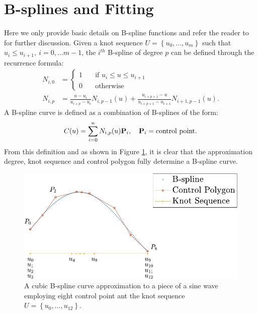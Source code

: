  \section{B-splines and Fitting}
 Here we only provide basic details on B-spline functions and refer the reader to 
 \cite{nurbs_book, deboor2001practical, schumaker2015spline} for further discussion. 
 Given a knot sequence $U=\left\{u_0,\ldots,u_m\right\}$ such that $u_i\leq u_{i+1},\  i=0,\ldots m-1$,
 the $i^{th}$ B-spline of degree $p$ can be defined through the recurrence formula:
 \begin{align}
 N_{i,0} &= \left\{ \begin{aligned}
                    1 \quad &\text{if } u_i\leq u\leq u_{i+1}\\
                    0 \quad &\text{otherwise }
                   \end{aligned}\right. \\
N_{i,p} &= \frac{u - u_i}{u_{i+p} - u_i}N_{i,p-1}(u) +  \frac{u_{i+p+1} - u}{u_{i+p+1} - u_{i+1}}N_{i+1,p-1}(u). 
 \end{align}
 A B-spline curve is defined as a combination of B-splines of the form:
 \begin{equation}
  C(u) = \sum_{i=0}^n N_{i,p}(u) \textbf P_i, \quad  \textbf P_i = \text{control point}.
 \end{equation}
From this definition and as shown in Figure \ref{fig:bspline_sine}, 
it is clear that the approximation degree, 
knot sequence and control polygon fully determine a B-spline curve.
\begin{figure}
 \centering
 \includegraphics[width =\textwidth]{sineBspline-crop}
 \caption{\label{fig:bspline_sine} A cubic B-spline curve approximation to a piece of a sine wave employing eight control point ant the knot sequence 
 $U=\left\{u_0,\dots,u_{12}\right\}$.}
\end{figure}


